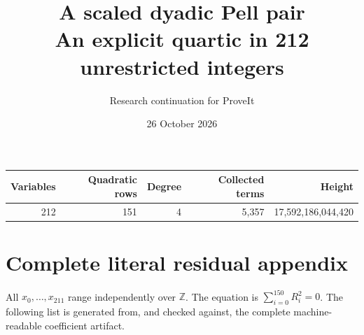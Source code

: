 \documentclass[11pt]{article}
\title{A scaled dyadic Pell pair\\\large An explicit quartic in 212 unrestricted integers}
\author{Research continuation for ProveIt}
\date{26 October 2026}
\begin{document}
\maketitle
\begin{center}
\begin{tabular}{rrrrr}
Variables&Quadratic rows&Degree&Collected terms&Height\\\midrule
212&151&4&5,357&17,592,186,044,420
\end{tabular}
\end{center}

\clearpage
\section{Complete literal residual appendix}
All $x_0,\ldots,x_{211}$ range independently over $\mathbb Z$. The equation is
$\sum_{i=0}^{150} R_i^2=0$. The following list is generated from, and checked
against, the complete machine-readable coefficient artifact.
\begingroup\scriptsize
\allowdisplaybreaks

\endgroup
\end{document}
